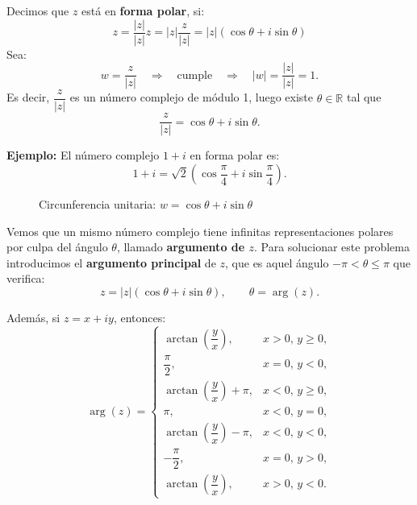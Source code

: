 \documentclass[a4paper,12pt]{article}
\begin{document}
\noindent
Decimos que $z$ está en \textbf{forma polar}, si:
\[
z = \dfrac{|z|}{|z|}z = |z|\dfrac{z}{|z|} = |z|(\cos\theta + i\sin\theta) 
\]
Sea:
\[
w = \frac{z}{|z|} \quad \Rightarrow \quad \text{cumple} \quad \Rightarrow \quad |w| = \frac{|z|}{|z|} = 1.
\]
Es decir, $\dfrac{z}{|z|}$ es un número complejo de módulo 1, luego existe $\theta \in \mathbb{R}$ tal que
\[
\frac{z}{|z|} = \cos\theta + i\sin\theta.
\]

\noindent\textbf{Ejemplo:} El número complejo $1+i$ en forma polar es:
\[
1+i = \sqrt{2}\left(\cos\frac{\pi}{4} + i\sin\frac{\pi}{4}\right).
\]

\begin{figure}[h]
\centering
{}

\medskip
{\small Circunferencia unitaria: \(w=\cos\theta+i\sin\theta\)}
\end{figure}
\noindent
Vemos que un mismo número complejo tiene infinitas representaciones polares por culpa del ángulo $\theta$, llamado \textbf{argumento de $z$}.  
Para solucionar este problema introducimos el \textbf{argumento principal} de $z$, que es aquel ángulo $-\pi < \theta \leq \pi$ que verifica:
\[
z = |z|(\cos\theta + i\sin\theta), \qquad \theta = \arg(z).
\]

\newpage
\noindent
Además, si $z = x+iy$, entonces:
\[
\arg(z) =
\begin{cases}
\arctan\!\left(\dfrac{y}{x}\right), & x > 0, \, y \geq 0, \\[1ex]
\dfrac{\pi}{2}, & x = 0, \, y < 0, \\[1ex]
\arctan\!\left(\dfrac{y}{x}\right)+\pi, & x < 0, \, y \geq 0, \\[1ex]
\pi, & x < 0, \, y = 0, \\[1ex]
\arctan\!\left(\dfrac{y}{x}\right)-\pi, & x < 0, \, y < 0, \\[1ex]
-\dfrac{\pi}{2}, & x = 0, \, y > 0, \\[1ex]
\arctan\!\left(\dfrac{y}{x}\right), & x > 0, \, y < 0.
\end{cases}
\]
\end{document}
